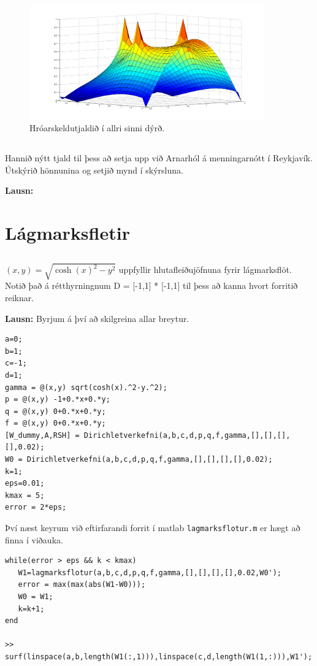 \documentclass[11pt,a4paper,titlepage]{article}
\begin{document}
  \begin{figure}[h!]
      \centering
      \includegraphics[width=0.9\textwidth]{hroarskelda_party.png}
      \caption{Hróarskeldutjaldið í allri sinni dýrð.}
      \label{fig:awesome_image11}
  \end{figure}
  \newpage
  
  
 \subsection{}
 Hannið nýtt tjald til þess að setja upp við Arnarhól á menningarnótt í Reykjavík. Útskýrið hönnunina og setjið mynd í skýrsluna.
 
 \textbf{Lausn:}
 
 
 
\section{Lágmarksfletir}

\subsection{}
$(x,y)= \sqrt{\cosh (x)^{2}-y^{2}}$  uppfyllir hlutafleiðujöfnuna fyrir lágmarksflöt. Notið það á rétthyrningnum D = [-1,1] * [-1,1] til þess að kanna hvort forritið reiknar.

\textbf{Lausn:}
Byrjum á því að skilgreina allar breytur. 
\begin{verbatim}
a=0;
b=1;
c=-1;
d=1;
gamma = @(x,y) sqrt(cosh(x).^2-y.^2);
p = @(x,y) -1+0.*x+0.*y;
q = @(x,y) 0+0.*x+0.*y;
f = @(x,y) 0+0.*x+0.*y;
[W_dummy,A,RSH] = Dirichletverkefni(a,b,c,d,p,q,f,gamma,[],[],[],[],0.02);
W0 = Dirichletverkefni(a,b,c,d,p,q,f,gamma,[],[],[],[],0.02);
k=1;
eps=0.01;
kmax = 5;
error = 2*eps;
\end{verbatim}

Því næst keyrum við eftirfarandi forrit í matlab \verb|lagmarksflotur.m| er hægt að finna í viðauka.  
\begin{verbatim}
while(error > eps && k < kmax)
   W1=lagmarksflotur(a,b,c,d,p,q,f,gamma,[],[],[],[],0.02,W0');
   error = max(max(abs(W1-W0)));
   W0 = W1;
   k=k+1;
end

>> surf(linspace(a,b,length(W1(:,1))),linspace(c,d,length(W1(1,:))),W1');
\end{verbatim}
\end{document}
